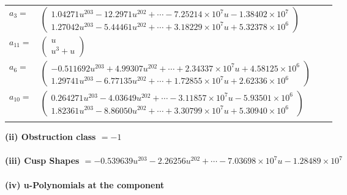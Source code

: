 \documentclass[1p]{elsarticle_modified}
\theoremstyle{definition}
\begin{document}
\begin{tabular}{m{7pt} m{180pt} m{7pt} m{180pt} }
\flushright $a_{3}=$&$\begin{pmatrix}1.04271 u^{203}-12.2971 u^{202}+\cdots-7.25214\times10^{7} u-1.38402\times10^{7}\\1.27042 u^{203}-5.44461 u^{202}+\cdots+3.18229\times10^{7} u+5.32378\times10^{6}\end{pmatrix}$ \\
\flushright $a_{11}=$&$\begin{pmatrix}u\\u^3+u\end{pmatrix}$ \\
\flushright $a_{6}=$&$\begin{pmatrix}-0.511692 u^{203}+4.99307 u^{202}+\cdots+2.34337\times10^{7} u+4.58125\times10^{6}\\1.29741 u^{203}-6.77135 u^{202}+\cdots+1.72855\times10^{7} u+2.62336\times10^{6}\end{pmatrix}$ \\
\flushright $a_{10}=$&$\begin{pmatrix}0.264271 u^{203}-4.03649 u^{202}+\cdots-3.11857\times10^{7} u-5.93501\times10^{6}\\1.82361 u^{203}-8.86050 u^{202}+\cdots+3.30799\times10^{7} u+5.30940\times10^{6}\end{pmatrix}$\\&\end{tabular}
\flushleft \textbf{(ii) Obstruction class $= -1$}\\~\\
\flushleft \textbf{(iii) Cusp Shapes $= -0.539639 u^{203}-2.26256 u^{202}+\cdots-7.03698\times10^{7} u-1.28489\times10^{7}$}\\~\\
\newpage\renewcommand{\arraystretch}{1}
\flushleft \textbf{(iv) u-Polynomials at the component}\newline \\
\end{document}
